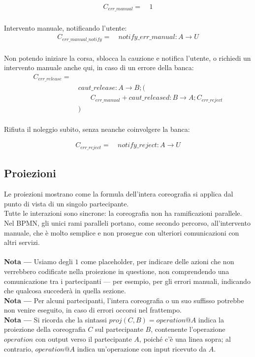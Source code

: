 \begin{align*}
C_{err\_manual} = & \ 1 \\
\end{align*}

Intervento manuale, notificando l'utente:\\

\begin{align*}
C_{err\_manual\_notify} = & \ notify\_err\_manual: A \rightarrow U \\
\end{align*}

Non potendo iniziare la corsa, sblocca la cauzione e notifica l'utente, o
richiedi un intervento manuale anche qui, in caso di un errore della banca:\\

\begin{align*}
C_{err\_release} = \\
& \ caut\_release: A \rightarrow B ; ( \\
& \quad \quad C_{err\_manual} + caut\_released: B \rightarrow A ; C_{err\_reject} \\
& \ ) \\
\end{align*}

Rifiuta il noleggio subito, senza neanche coinvolgere la banca:

\begin{align*}
C_{err\_reject} = & \ notify\_reject: A \rightarrow U
\end{align*}


\subsection{Proiezioni}
Le proiezioni mostrano come la formula dell'intera coreografia si applica dal
punto di vista di un singolo partecipante.\\
Tutte le interazioni sono sincrone: la coreografia non ha ramificazioni
parallele. Nel BPMN, gli unici rami paralleli portano, come secondo percorso,
all'intervento manuale, che è molto semplice e non prosegue con ulteriori
comunicazioni con altri servizi.\\
\\
\textbf{Nota ---} Usiamo degli $1$ come placeholder, per indicare delle azioni
che non verrebbero codificate nella proiezione in questione, non comprendendo
una comunicazione tra i partecipanti --- per esempio, per gli errori manuali,
indicando che qualcosa succederà in quella sezione.\\
\textbf{Nota ---} Per alcuni partecipanti, l'intera coreografia o un suo
suffisso potrebbe non venire eseguito, in caso di errori occorsi nel
frattempo.\\
\textbf{Nota ---} Si ricorda che la sintassi \mbox{$proj(C, B) =
\overline{operation}@A$} indica la proiezione della coreografia $C$ sul
partecipante $B$, contenente l'operazione $operation$ con output verso il
partecipante $A$, poiché c'è una linea sopra; al contrario, $operation@A$ indica
un'operazione con input ricevuto da $A$.\\



